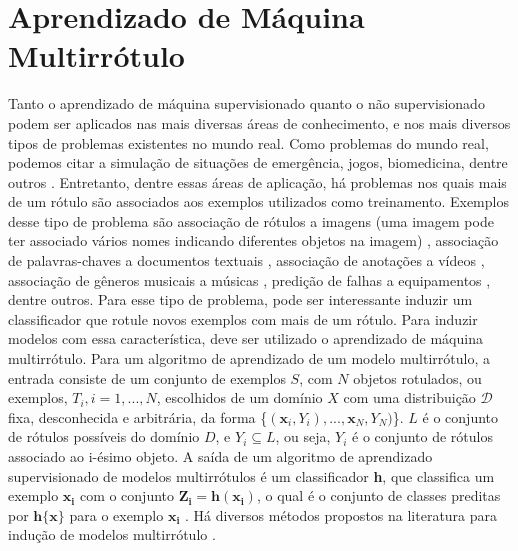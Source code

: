 \section {Aprendizado de Máquina Multirrótulo}

Tanto o aprendizado de máquina supervisionado quanto o não supervisionado podem ser aplicados nas mais diversas áreas de conhecimento, e nos mais diversos tipos de problemas existentes no mundo real. Como problemas do mundo real, podemos citar a simulação de situações de emergência, jogos, biomedicina, dentre outros \cite{faceli2011inteligencia}. Entretanto, dentre essas áreas de aplicação, há problemas nos quais mais de um rótulo são associados aos exemplos utilizados como treinamento. Exemplos desse tipo de problema são associação de rótulos a imagens (uma imagem pode ter associado vários nomes indicando diferentes objetos na imagem) \cite{shen2004multilabel}, associação de palavras-chaves a documentos textuais \cite{sebastiani2002machine,schapire2000boostexter}, associação de anotações a vídeos \cite{dimou2009empirical}, associação de gêneros musicais a músicas \cite{lukashevich2009multi}, predição de falhas a equipamentos \cite{bernardini2009artificial}, dentre outros. Para esse tipo de problema, pode ser interessante induzir um classificador que rotule novos exemplos com mais de um rótulo. Para induzir modelos com essa característica, deve ser utilizado o aprendizado de máquina multirrótulo. Para um algoritmo de aprendizado de um modelo multirrótulo, a entrada consiste de um conjunto de exemplos $S$, com $N$ objetos rotulados, ou exemplos, $T_i, i=1,...,N$, escolhidos de um domínio $X$ com uma distribuição $\mathcal{D}$ fixa, desconhecida e arbitrária, da forma \{$(\mathbf{x}_i,Y_i),..., \mathbf{x}_N,Y_N)$\}. $L$ é o conjunto de rótulos possíveis do domínio $D$, e $Y_i \subseteq L$, ou seja, $Y_i$ é o conjunto de rótulos associado ao i-ésimo objeto. A saída de um algoritmo de aprendizado supervisionado de modelos multirrótulos é um classificador \textbf{h}, que classifica um exemplo $\mathbf{x_i}$ com o conjunto $\mathbf{Z_i = h(x_i)}$, o qual é o conjunto de classes preditas por $\mathbf{h\{x\}}$ para o exemplo $\mathbf{x_i}$ . Há diversos métodos propostos na literatura para indução de modelos multirrótulo \cite{tsoumakas2010mining,calembo2011proposta,alvares2012incorporating,da2013rb}.


